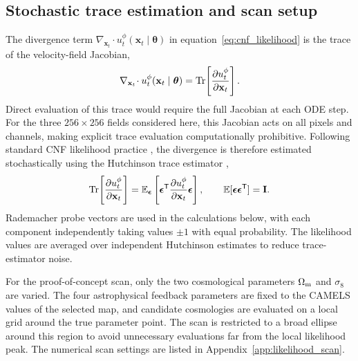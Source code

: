 \documentclass[usenatbib]{mnras}
\newcommand{\Om}{\Omega_{\rm m}}
\newcommand{\sig}{\sigma_8}
\newcommand{\thetavec}{\boldsymbol{\theta}}
\begin{document}
\subsection{Stochastic trace estimation and scan setup}
\label{sec:likelihood_hutchinson}
The divergence term
$\nabla_{\mathbf{x}_t}\!\cdot
u_t^\phi(\mathbf{x}_t\mid\thetavec)$ in
equation~\eqref{eq:cnf_likelihood} is the trace of the velocity-field
Jacobian,
\begin{equation}
  \nabla_{\mathbf{x}_t}\!\cdot
  u_t^\phi(\mathbf{x}_t\mid\thetavec)
  =
  {\rm Tr}\!\left[
    \frac{\partial u_t^\phi}{\partial \mathbf{x}_t}
  \right].
  \label{eq:trace_exact}
\end{equation}
Direct evaluation of this trace would require the full Jacobian at each
ODE step. For the three $256\times256$ fields considered here, this
Jacobian acts on all pixels and channels, making explicit trace
evaluation computationally prohibitive. Following standard CNF
likelihood practice \citep{Grathwohl2019,Lipman2023}, the divergence is
therefore estimated stochastically using the Hutchinson trace estimator
\citep{Hutchinson1989},
\begin{equation}
  {\rm Tr}\!\left[
    \frac{\partial u_t^\phi}{\partial \mathbf{x}_t}
  \right]
  =
  \mathbb{E}_{\boldsymbol{\epsilon}}
  \left[
    \boldsymbol{\epsilon}^{\mathsf T}
    \frac{\partial u_t^\phi}{\partial \mathbf{x}_t}
    \boldsymbol{\epsilon}
  \right],
  \qquad
  \mathbb{E}
  [\boldsymbol{\epsilon}\boldsymbol{\epsilon}^{\mathsf T}]
  =
  \mathbf{I}.
  \label{eq:hutchinson}
\end{equation}
Rademacher probe vectors are used in the calculations below, with each
component independently taking values $\pm1$ with equal probability.
The likelihood values are averaged over independent Hutchinson
estimates to reduce trace-estimator noise.

For the proof-of-concept scan, only the two cosmological parameters
$\Om$ and $\sig$ are varied. The four astrophysical feedback parameters
are fixed to the CAMELS values of the selected map, and candidate
cosmologies are evaluated on a local grid around the true parameter
point. The scan is restricted to a broad ellipse around this region to
avoid unnecessary evaluations far from the local likelihood peak. The
numerical scan settings are listed in Appendix~\ref{app:likelihood_scan}.
\end{document}
